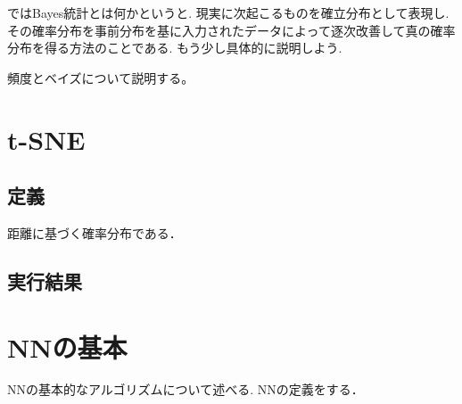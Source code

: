 \documentclass{ujarticle}
\begin{document}
ではBayes統計とは何かというと.
現実に次起こるものを確立分布として表現し.
その確率分布を事前分布を基に入力されたデータによって逐次改善して真の確率分布を得る方法のことである.
もう少し具体的に説明しよう.


頻度とベイズについて説明する。

\section{t-SNE}
\label{sec:t-SNE}
\subsection{定義}
\label{sub:定義}
距離に基づく確率分布である．

\subsection{実行結果}
\label{sub:実行結果}

\section{NNの基本}
\label{sec:NNの基本}

NNの基本的なアルゴリズムについて述べる.
NNの定義をする．
\end{document}
